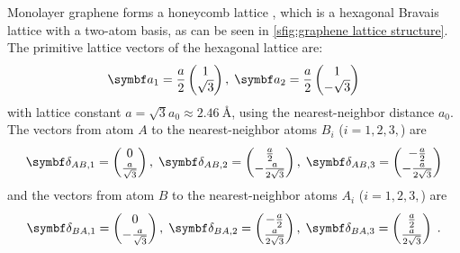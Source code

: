 \documentclass[../notes.tex]{subfiles}
\begin{document}
Monolayer graphene forms a honeycomb lattice \cite{yangStructureGrapheneIts2018}, which is a hexagonal Bravais lattice with a two-atom basis, as can be seen in \cref{sfig:graphene lattice structure}.
The primitive lattice vectors of the hexagonal lattice are:
\begin{align}
	\vb{a}_1 = \frac{a}{2} \begin{pmatrix} 1 \\ \sqrt{3} \end{pmatrix}, \; \vb{a}_2 = \frac{a}{2} \begin{pmatrix} 1 \\ -\sqrt{3} \end{pmatrix}
\end{align}
with lattice constant \(a = \sqrt{3} a_0 \approx \SI{2.46}{\angstrom}\), using the nearest-neighbor distance \(a_0\).
The vectors from atom \(A\) to the nearest-neighbor atoms \(B_i\) (\(i = 1, 2, 3,\)) are
\begin{align}
	\vb{\delta}_{AB, 1} = \begin{pmatrix} 0 \\ \frac{a}{\sqrt{3}} \end{pmatrix},\; \vb{\delta}_{AB, 2} = \begin{pmatrix} \frac{a}{2} \\ -\frac{a}{2\sqrt{3}} \end{pmatrix},\; \vb{\delta}_{AB, 3} = \begin{pmatrix} -\frac{a}{2} \\ -\frac{a}{2\sqrt{3}} \end{pmatrix}
\end{align}
and the vectors from atom \(B\) to the nearest-neighbor atoms \(A_i\) (\(i = 1, 2, 3,\)) are
\begin{align}
	\vb{\delta}_{BA, 1} = \begin{pmatrix} 0 \\ -\frac{a}{\sqrt{3}} \end{pmatrix},\; \vb{\delta}_{BA, 2} = \begin{pmatrix} -\frac{a}{2} \\ \frac{a}{2\sqrt{3}} \end{pmatrix},\; \vb{\delta}_{BA, 3} = \begin{pmatrix} \frac{a}{2} \\ \frac{a}{2\sqrt{3}} \end{pmatrix} \;.
\end{align}
\end{document}
